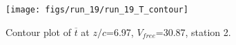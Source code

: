 \begin{figure}[H]
\centering
\texttt{[image: figs/run\_19/run\_19\_T\_contour]}
\caption{Contour plot of $\overline{t}$ at $z/c$=6.97, $V_{free}$=30.87, station 2.}
\label{fig:run_19_T_contour}
\end{figure}


